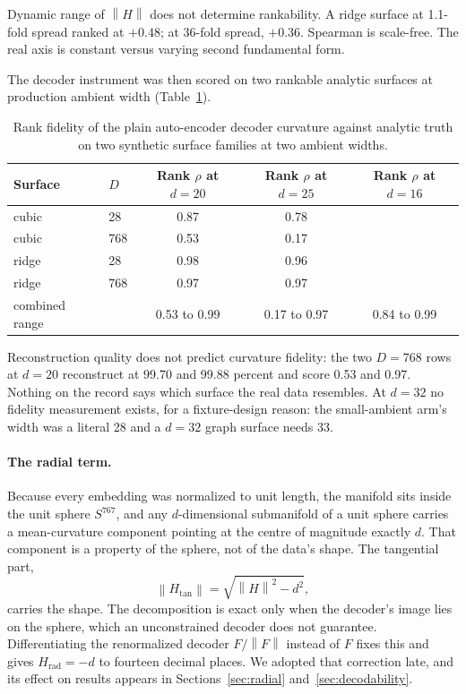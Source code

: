 \documentclass[11pt,a4paper]{article}
\newcommand{\Htan}{H_{\mathrm{tan}}}
\newcommand{\Hrad}{H_{\mathrm{rad}}}
\newcommand{\norm}[1]{\left\lVert #1 \right\rVert}
\begin{document}
Dynamic range of $\norm{H}$ does not determine rankability. A ridge surface at 1.1-fold spread ranked at $+0.48$; at 36-fold spread, $+0.36$. Spearman is scale-free. The real axis is constant versus varying second fundamental form.

The decoder instrument was then scored on two rankable analytic surfaces at production ambient width (Table~\ref{tab:fidelity}).

\begin{table}[h]
\centering
\begin{tabular}{llccc}
\toprule
Surface & $D$ & Rank $\rho$ at $d=20$ & Rank $\rho$ at $d=25$ & Rank $\rho$ at $d=16$ \\
\midrule
cubic & 28  & 0.87 & 0.78 & \\
cubic & 768 & 0.53 & 0.17 & \\
ridge & 28  & 0.98 & 0.96 & \\
ridge & 768 & 0.97 & 0.97 & \\
\midrule
combined range & & 0.53 to 0.99 & 0.17 to 0.97 & 0.84 to 0.99 \\
\bottomrule
\end{tabular}
\caption{Rank fidelity of the plain auto-encoder decoder curvature against analytic truth on two synthetic surface families at two ambient widths.}
\label{tab:fidelity}
\end{table}

Reconstruction quality does not predict curvature fidelity: the two $D = 768$ rows at $d = 20$ reconstruct at 99.70 and 99.88 percent and score 0.53 and 0.97. Nothing on the record says which surface the real data resembles. At $d = 32$ no fidelity measurement exists, for a fixture-design reason: the small-ambient arm's width was a literal 28 and a $d = 32$ graph surface needs 33.

\paragraph{The radial term.} Because every embedding was normalized to unit length, the manifold sits inside the unit sphere $S^{767}$, and any $d$-dimensional submanifold of a unit sphere carries a mean-curvature component pointing at the centre of magnitude exactly $d$. That component is a property of the sphere, not of the data's shape. The tangential part,
\begin{equation}
\norm{\Htan} = \sqrt{\norm{H}^2 - d^2},
\end{equation}
carries the shape. The decomposition is exact only when the decoder's image lies on the sphere, which an unconstrained decoder does not guarantee. Differentiating the renormalized decoder $F/\norm{F}$ instead of $F$ fixes this and gives $\Hrad = -d$ to fourteen decimal places. We adopted that correction late, and its effect on results appears in Sections~\ref{sec:radial} and~\ref{sec:decodability}.
\end{document}
